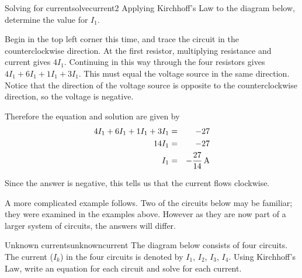 \begin{example}{Solving for current}{solvecurrent2}
Applying Kirchhoff's Law to the diagram below, determine the value for $I_1$. 

\begin{center}
\end{center}

\end{example}

\begin{solution}
Begin in the top left corner this time, and trace the circuit in the counterclockwise direction. At the first resistor, multiplying resistance and current gives $4I_1$. Continuing in this way through the four resistors gives $4I_1 + 6I_1 + 1 I_1 + 3I_1$. This must equal the voltage source in the same direction. Notice that the direction of the voltage source is opposite to the counterclockwise direction, so the voltage is negative. 

Therefore the equation and solution are given by
\begin{eqnarray*}
4I_1 + 6I_1 + 1 I_1 + 3I_1&=& -27 \\
14I_1 &=& -27 \\
I_1 &=& -\frac{27}{14} \mathop{\textrm{\rm A}}\nolimits
\end{eqnarray*}

Since the answer is negative, this tells us that the current flows clockwise. 
\end{solution}

A more complicated example follows. Two of the circuits below may be familiar; they were examined in the examples above. However as they are now part of a larger system of circuits, the answers will differ. 

\begin{example}{Unknown currents}{unknowncurrent}
  The diagram below consists of four circuits. The current ($I_k$) in
  the four circuits is denoted by $I_{1}$, $I_{2}$, $I_{3}$,
  $I_{4}$. Using Kirchhoff's Law, write an equation for each circuit
  and solve for each current.
\end{example}

